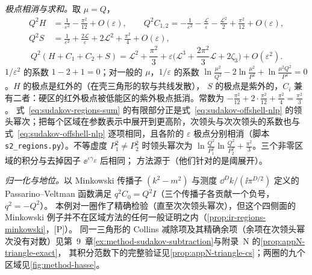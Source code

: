 \begin{example}
\emph{极点相消与求和。}取 $\mu=Q$，
\begin{align*}
Q^2H&=\frac1{\varepsilon^2}-\frac{\pi^2}{12}+O(\varepsilon),\qquad
Q^2C_{1,2}=-\frac1{\varepsilon^2}-\frac{\mathcal L}{\varepsilon}-\frac{\mathcal L^2}2+\frac{\pi^2}{12}+O(\varepsilon),\\
Q^2S&=\frac1{\varepsilon^2}+\frac{2\mathcal L}{\varepsilon}+2\mathcal L^2+\frac{\pi^2}4+O(\varepsilon),
\end{align*}
\begin{equation}\label{eq:sudakov-regions-sum}
Q^2(H+C_1+C_2+S)=\mathcal L^2+\frac{\pi^2}3+\varepsilon\Big(\mathcal L^3+\frac{2\pi^2}3\mathcal L+2\zeta_3\Big)+O(\varepsilon^2).
\end{equation}
$1/\varepsilon^2$ 的系数 $1-2+1=0$；对一般的 $\mu$，$1/\varepsilon$ 的系数 $\ln\frac{\mu^2}{Q^2}-2\ln\frac{\mu^2}{P^2}+\ln\frac{\mu^2Q^2}{P^4}=0$。$H$ 的极点是红外的（在壳三角形的软与共线发散），
$S$ 的极点是紫外的，$C_i$ 兼有二者：硬区的红外极点被低能区的紫外极点抵消。常数为 $-\frac{\pi^2}{12}+2\cdot\frac{\pi^2}{12}+\frac{\pi^2}4=\frac{\pi^2}3$。
式~\eqref{eq:sudakov-regions-sum} 的有限部分正是式~\eqref{eq:sudakov-offshell-nlp} 的领头幂次；把每个区域在参数表示中展开到更高阶，次领头与次次领头的系数也与
式~\eqref{eq:sudakov-offshell-nlp} 逐项相同，且各阶的 $\varepsilon$ 极点分别相消（脚本 \texttt{s2\_regions.py}）。不等虚度 $P_1^2\ne P_2^2$ 时领头幂次为
$\ln\frac{Q^2}{P_1^2}\ln\frac{Q^2}{P_2^2}+\frac{\pi^2}3$。三个非零区域的积分与\cite[第~2.2~节，式~(2.39)--(2.44)]{BecherBroggioFerroglia2015}去掉因子 $\ee^{\varepsilon\gamma_E}$ 后相同；
方法源于\cite{BenekeSmirnov1998}（他们针对的是阈展开）。

\emph{归一化与地位。}以 Minkowski 传播子 $(k^2-m^2)$ 与测度 $\dd^Dk/(\ii\pi^{D/2})$ 定义的 Passarino--Veltman 函数满足 $q^2C_0=Q^2I$（三个传播子各贡献一个负号，$q^2=-Q^2$）。%
本例对一圈作了精确检验（直至次次领头幂次），但这个四侧面的 Minkowski 例子并不在区域方法的任何一般证明之内（\cref{prop:ir-regions-minkowski}，[P]）。
同一三角形的 Collins 减除项及其精确余项（余项在次领头幂次没有对数）见第~9~章\cref{ex:method-sudakov-subtraction}与附录~N 的\cref{prop:appN-triangle-exact}，
其积分范数下的完整验证见\cref{prop:appN-triangle-cs}；两圈的九个区域见\cref{fig:method-hasse}。
\end{example}

